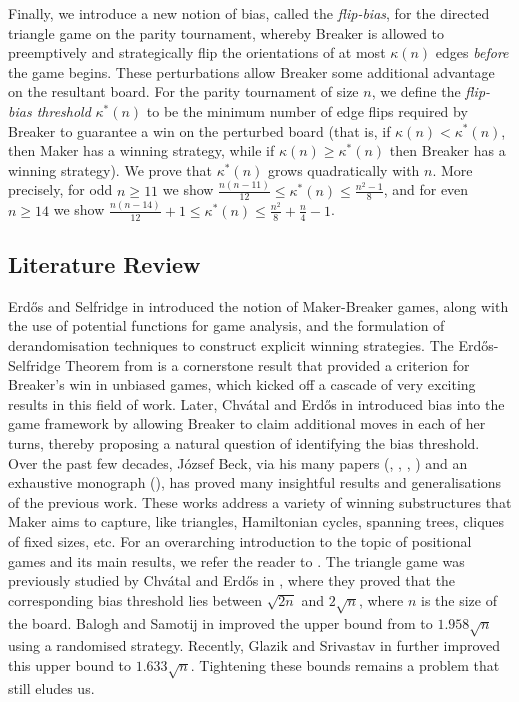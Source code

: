 \documentclass{article}
\theoremstyle{definition}
\theoremstyle{plain}
\theoremstyle{remark}
\theoremstyle{definition}
\begin{document}
Finally, we introduce a new notion of bias, called the \emph{flip-bias}, for the directed triangle game on the parity tournament, whereby Breaker is allowed to preemptively and strategically flip the orientations of at most $\kappa(n)$ edges \emph{before} the game begins. These perturbations allow Breaker some additional advantage on the resultant board. For the parity tournament of size $n$, we define the \emph{flip-bias threshold} $\kappa^*(n)$ to be the minimum number of edge flips required by Breaker to guarantee a win on the perturbed board (that is, if $\kappa(n) < \kappa^*(n)$, then Maker has a winning strategy, while if $\kappa(n) \ge \kappa^*(n)$ then Breaker has a winning strategy). We prove that $\kappa^*(n)$ grows quadratically with $n$. More precisely, for odd $n\ge 11$ we show $\frac{n(n-11)}{12} \le \kappa^*(n) \le \frac{n^2-1}{8}$, and for even $n\ge 14$ we show $\frac{n(n-14)}{12} + 1\le \kappa^*(n) \le \frac{n^2}{8}+\frac{n}{4}-1$.

\subsection{Literature Review}

Erdős and Selfridge in \cite{erdos1973combinatorial} introduced the notion of Maker-Breaker games, along with the use of potential functions for game analysis, and the formulation of derandomisation techniques to construct explicit winning strategies.  The Erdős-Selfridge Theorem from \cite{erdos1973combinatorial} is a cornerstone result that provided a criterion for Breaker's win in unbiased games, which kicked off a cascade of very exciting results in this field of work. Later, Chvátal and Erdős in  \cite{chvatal1978biased} introduced bias into the game framework by allowing Breaker to claim additional moves in each of her turns, thereby proposing a natural question of identifying the bias threshold. Over the past few decades, J\'{o}zsef Beck, via his many papers (\cite{beck1981positional}, \cite{beck1982remarks}, \cite{beck1985random}, \cite{beck1994deterministic}) and an exhaustive monograph (\cite{beck2008combinatorial}), has proved many insightful results and generalisations of the previous work. These works address a variety of winning substructures that Maker aims to capture, like triangles, Hamiltonian cycles, spanning trees, cliques of fixed sizes, etc. For an overarching introduction to the topic of positional games and its main results, we refer the reader to \cite{Hefetz2014-mg}.
The triangle game was previously studied by Chvátal and Erdős in \cite{chvatal1978biased}, where they proved that the corresponding bias threshold lies between $\sqrt{2n}$ and $2\sqrt{n}$, where $n$ is the size of the board. Balogh and Samotij in \cite{balogh2011chvatal} improved the upper bound from \cite{chvatal1978biased} to $1.958\sqrt{n}$ using a randomised strategy. Recently, Glazik and Srivastav in \cite{glazik2022new} further improved this upper bound to $1.633\sqrt{n}$. Tightening these bounds remains a problem that still eludes us.
\end{document}
